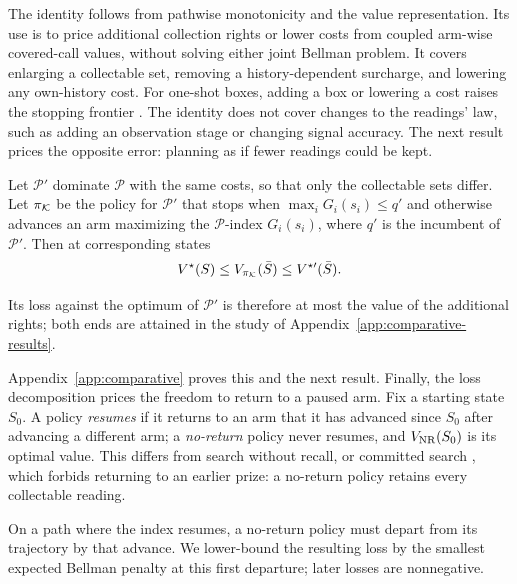 The identity follows from pathwise monotonicity and the value representation. Its use is
to price additional collection rights or lower costs from coupled arm-wise covered-call
values, without solving either joint Bellman problem. It covers enlarging a collectable
set, removing a history-dependent surcharge, and lowering any own-history cost.
For one-shot boxes, adding a box or lowering a cost raises the stopping frontier
\citep[Proposition~2]{bao2026interdependent}. The identity does not cover changes to the
readings' law, such as adding an observation stage or changing signal accuracy.
The next result prices the opposite error: planning
as if fewer readings could be kept.

\begin{proposition}\label{prop:fewer-rights}
Let $\mathcal P'$ dominate $\mathcal P$ with the same costs, so that only the collectable sets differ. Let $\pi_{\mathcal{K}}$ be the policy for $\mathcal P'$ that stops when $\max_iG_i(s_i)\le q'$ and otherwise advances an arm maximizing the $\mathcal P$-index $G_i(s_i)$, where $q'$ is the incumbent of $\mathcal P'$. Then at corresponding states \[ V^\star(S)\le V_{\pi_{\mathcal{K}}}(\bar S)\le V^{\star\prime}(\bar S). \] \end{proposition} Its loss against the optimum of $\mathcal P'$ is therefore at most the value of the additional rights; both ends are attained in the study of Appendix~\ref{app:comparative-results}.

Appendix~\ref{app:comparative} proves this and the next result. Finally, the
loss decomposition prices the freedom to return to a paused arm. Fix a starting state
$S_0$. A policy \emph{resumes} if it returns to an arm that it has advanced since $S_0$
after advancing a different arm; a \emph{no-return} policy never resumes, and $V_{\rm NR}(S_0)$
is its optimal value. This differs from search without recall, or committed search
\citep[Section~5]{gupta2019markovian}, which forbids returning to an earlier prize:
a no-return policy retains every collectable reading.

On a path where the index resumes, a no-return policy must depart from its
trajectory by that advance. We lower-bound the resulting loss by the smallest
expected Bellman penalty at this first departure; later losses are nonnegative.

